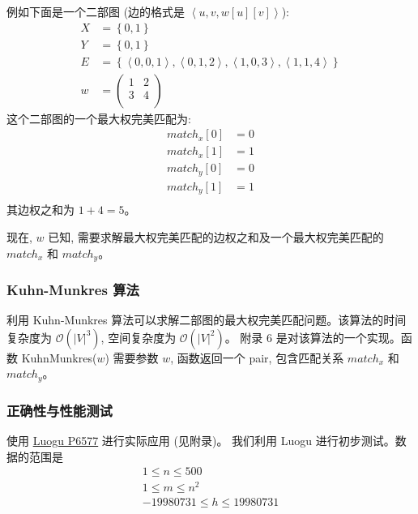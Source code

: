 例如下面是一个二部图 (边的格式是 $\left<u, v, w[u][v]\right>$):
$$
\begin{aligned}
	X &= \left\{0, 1\right\} \\
	Y &= \left\{0, 1\right\} \\
	E &= \left\{\left<0, 0, 1\right>, \left<0, 1, 2\right>, \left<1, 0, 3\right>, \left<1, 1, 4\right>\right\} \\
	w &=
	\begin{pmatrix}
		1 & 2 \\
		3 & 4 \\
	\end{pmatrix} 
\end{aligned}
$$
这个二部图的一个最大权完美匹配为:
$$
\begin{aligned}
	match_x[0] &= 0 \\
	match_x[1] &= 1 \\
	match_y[0] &= 0 \\
	match_y[1] &= 1 \\
\end{aligned}
$$
其边权之和为 $1 + 4 = 5$。

现在, $w$ 已知, 需要求解最大权完美匹配的边权之和及一个最大权完美匹配的 $match_x$ 和 $match_y$。
\subsubsection{Kuhn-Munkres 算法}
利用 Kuhn-Munkres 算法可以求解二部图的最大权完美匹配问题。该算法的时间复杂度为 $\mathcal{O}(\left|V\right|^3)$, 空间复杂度为 $\mathcal{O}(\left|V\right|^2)$。
附录 6 是对该算法的一个实现。函数 KuhnMunkres($w$) 需要参数 $w$, 函数返回一个 pair, 包含匹配关系 $match_x$ 和 $match_y$。
\subsubsection{正确性与性能测试}
使用 \href{https://www.luogu.com.cn/problem/P6577}{Luogu P6577} 进行实际应用 (见附录)。
我们利用 Luogu 进行初步测试。数据的范围是
$$
\begin{gathered}
	1 \leq n \leq 500 \\
	1 \leq m \leq n^2 \\
	-19980731 \leq h \leq 19980731
\end{gathered}
$$

